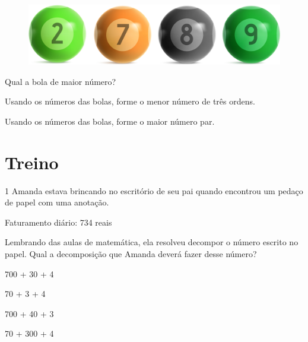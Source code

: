 \begin{figure}[htpb!]
\centering
\includegraphics[width=\textwidth]{./media/image7.png}
\end{figure}


\begin{escolha}
\item Qual a bola de maior número?

\item Usando os números das bolas, forme o menor número de três ordens. 

\item Usando os números das bolas, forme o maior número par.

\end{escolha}


\section*{Treino}

\num{1} Amanda estava brincando no escritório de seu pai quando
encontrou um pedaço de papel com uma anotação.

\begin{myquote}
Faturamento diário: 734 reais
\end{myquote}

Lembrando das aulas de matemática, ela resolveu decompor o número escrito
no papel. Qual a decomposição que Amanda deverá fazer desse
número?

\begin{escolha}
\item
  700 + 30 + 4
\item
  70 + 3 + 4
\item
  700 + 40 + 3
\item
  70 + 300 + 4
\end{escolha}

